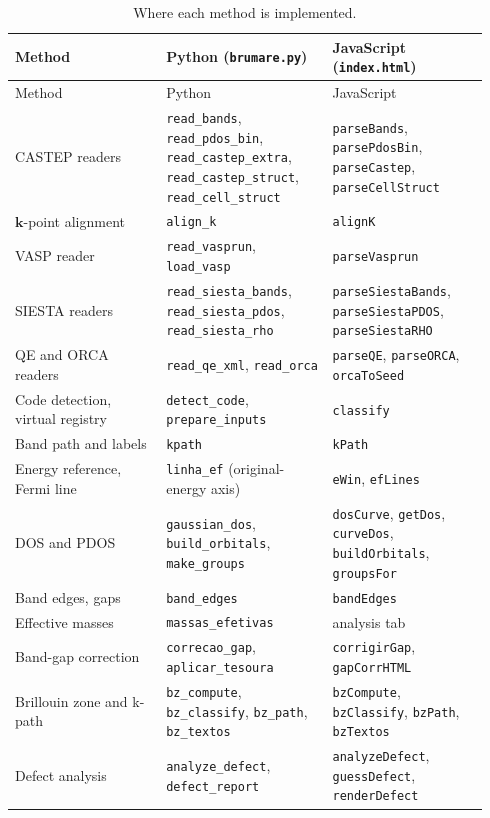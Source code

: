 \documentclass[11pt,a4paper]{article}
\newcommand{\code}[1]{\texttt{#1}}
\begin{document}
\begin{small}
\begin{longtable}{@{}p{0.30\linewidth}p{0.33\linewidth}p{0.31\linewidth}@{}}
\caption{Where each method is implemented.}\label{tab:map}\\\toprule
Method & Python (\code{brumare.py}) & JavaScript (\code{index.html}) \\\midrule\endfirsthead
\toprule Method & Python & JavaScript \\\midrule\endhead
CASTEP readers & \code{read\_bands}, \code{read\_pdos\_bin}, \code{read\_castep\_extra}, \code{read\_castep\_struct}, \code{read\_cell\_struct} & \code{parseBands}, \code{parsePdosBin}, \code{parseCastep}, \code{parseCellStruct} \\
$\bm{k}$-point alignment & \code{align\_k} & \code{alignK} \\
VASP reader & \code{read\_vasprun}, \code{load\_vasp} & \code{parseVasprun} \\
SIESTA readers & \code{read\_siesta\_bands}, \code{read\_siesta\_pdos}, \code{read\_siesta\_rho} & \code{parseSiestaBands}, \code{parseSiestaPDOS}, \code{parseSiestaRHO} \\
QE and ORCA readers & \code{read\_qe\_xml}, \code{read\_orca} & \code{parseQE}, \code{parseORCA}, \code{orcaToSeed} \\
Code detection, virtual registry & \code{detect\_code}, \code{prepare\_inputs} & \code{classify} \\
Band path and labels & \code{kpath} & \code{kPath} \\
Energy reference, Fermi line & \code{linha\_ef} (original-energy axis) & \code{eWin}, \code{efLines} \\
DOS and PDOS & \code{gaussian\_dos}, \code{build\_orbitals}, \code{make\_groups} & \code{dosCurve}, \code{getDos}, \code{curveDos}, \code{buildOrbitals}, \code{groupsFor} \\
Band edges, gaps & \code{band\_edges} & \code{bandEdges} \\
Effective masses & \code{massas\_efetivas} & analysis tab \\
Band-gap correction & \code{correcao\_gap}, \code{aplicar\_tesoura} & \code{corrigirGap}, \code{gapCorrHTML} \\
Brillouin zone and k-path & \code{bz\_compute}, \code{bz\_classify}, \code{bz\_path}, \code{bz\_textos} & \code{bzCompute}, \code{bzClassify}, \code{bzPath}, \code{bzTextos} \\
Defect analysis & \code{analyze\_defect}, \code{defect\_report} & \code{analyzeDefect}, \code{guessDefect}, \code{renderDefect} \\

\end{longtable}
\end{small}
\end{document}
